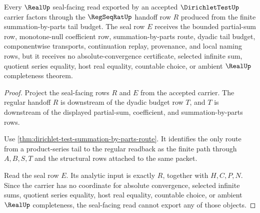 \begin{theorem}
\label{thm:dirichlet-test-real-seal-handoff}
Every $\RealUp$ seal-facing read exported by an accepted $\DirichletTestUp$ carrier factors through the $\RegSeqRatUp$ handoff row $R$ produced from the finite summation-by-parts tail budget. The seal row $E$ receives the bounded partial-sum row, monotone-null coefficient row, summation-by-parts route, dyadic tail budget, componentwise transports, continuation replay, provenance, and local naming rows, but it receives no absolute-convergence certificate, selected infinite sum, quotient series equality, host real equality, countable choice, or ambient $\RealUp$ completeness theorem.
\end{theorem}
\begin{proof}
Project the seal-facing rows $R$ and $E$ from the accepted carrier. The regular handoff $R$ is downstream of the dyadic budget row $T$, and $T$ is downstream of the displayed partial-sum, coefficient, and summation-by-parts rows.

Use \autoref{thm:dirichlet-test-summation-by-parts-route}. It identifies the only route from a product-series tail to the regular readback as the finite path through $A,B,S,T$ and the structural rows attached to the same packet.

Read the seal row $E$. Its analytic input is exactly $R$, together with $H,C,P,N$. Since the carrier has no coordinate for absolute convergence, selected infinite sums, quotient series equality, host real equality, countable choice, or ambient $\RealUp$ completeness, the seal-facing read cannot export any of those objects.
\end{proof}

